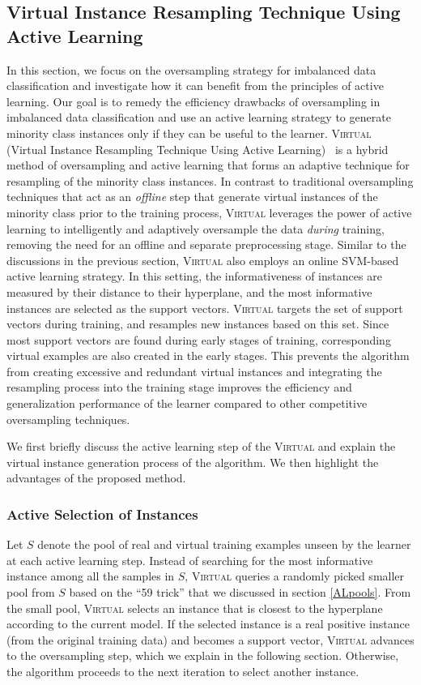 \subsection{Virtual Instance Resampling Technique Using Active Learning}
In this section, we focus on the oversampling strategy for imbalanced data classification and investigate how it can benefit from the principles of active learning. Our goal is to remedy the efficiency drawbacks of oversampling in imbalanced data classification and use an active learning strategy to generate minority class instances only if they can be useful to the learner. \textsc{Virtual} (Virtual Instance Resampling Technique Using Active Learning)~\cite{Ertekin_dissertation} is a hybrid method of oversampling and active learning that forms an adaptive technique for resampling of the minority class instances. In contrast to traditional oversampling techniques that act as an \textit{offline} step that generate virtual instances of the minority class prior to the training process, \textsc{Virtual} leverages the power of active learning to intelligently and adaptively oversample the data \textit{during} training, removing the need for an offline and separate preprocessing stage. Similar to the discussions in the previous section, \textsc{Virtual} also employs an online SVM-based active learning strategy. In this setting, the informativeness of instances are measured by their distance to their hyperplane, and the most informative instances are selected as the support vectors. \textsc{Virtual} targets the set of support vectors during training, and resamples new instances based on this set. Since most support vectors are found during early stages of training, corresponding virtual examples are also created in the early stages. This prevents the algorithm from creating excessive and redundant virtual instances and integrating the resampling process into the training stage improves the efficiency and generalization performance of the learner compared to other competitive oversampling techniques.

We first briefly discuss the active learning step of the \textsc{Virtual} and explain the virtual instance generation process of the algorithm. We then highlight the advantages of the proposed method.

\subsubsection{Active Selection of Instances}
Let $S$ denote the pool of real and virtual training examples unseen by the learner at each active learning step. Instead of searching for the most informative instance among all the samples in $S$, \textsc{Virtual} queries a randomly picked smaller pool from $S$ based on the ``59 trick'' that we discussed in section \ref{ALpools}. From the small pool, \textsc{Virtual} selects an instance that is closest to the hyperplane according to the current model. If the selected instance is a real positive instance (from the original training data) and becomes a support vector, \textsc{Virtual} advances to the oversampling step, which we explain in the following section. Otherwise, the algorithm proceeds to the next iteration to select another instance.



